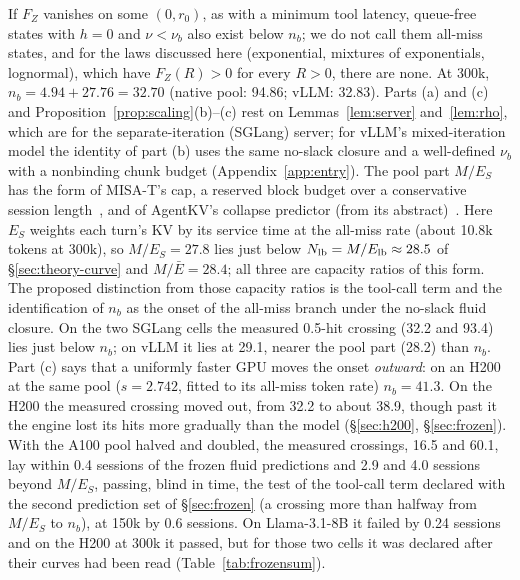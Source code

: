 \noindent If $F_Z$ vanishes on some $(0,r_0)$, as with a minimum tool latency, queue-free states with $h=0$ and $\nu<\nu_b$ also exist below $n_b$; we do not call them all-miss states, and for the laws discussed here (exponential, mixtures of exponentials, lognormal), which have $F_Z(R)>0$ for every $R>0$, there are none. At 300k, $n_b=4.94+27.76=32.70$ (native pool: 94.86; vLLM: 32.83). Parts (a) and (c) and Proposition~\ref{prop:scaling}(b)--(c) rest on Lemmas~\ref{lem:server} and~\ref{lem:rho}, which are for the separate-iteration (SGLang) server; for vLLM's mixed-iteration model the identity of part (b) uses the same no-slack closure and a well-defined $\nu_b$ with a nonbinding chunk budget (Appendix~\ref{app:entry}). The pool part $M/E_S$ has the form of MISA-T's cap, a reserved block budget over a conservative session length~\citep{hong2026misat}, and of AgentKV's collapse predictor (from its abstract)~\citep{anon2026agentkv}. Here $E_S$ weights each turn's KV by its service time at the all-miss rate (about 10.8k tokens at 300k), so $M/E_S=27.8$ lies just below $N_{\mathrm{lb}}=M/E_{\mathrm{lb}}\approx28.5$ of \S\ref{sec:theory-curve} and $M/\bar E=28.4$; all three are capacity ratios of this form. The proposed distinction from those capacity ratios is the tool-call term and the identification of $n_b$ as the onset of the all-miss branch under the no-slack fluid closure. On the two SGLang cells the measured 0.5-hit crossing (32.2 and 93.4) lies just below $n_b$; on vLLM it lies at 29.1, nearer the pool part (28.2) than $n_b$. Part (c) says that a uniformly faster GPU moves the onset \emph{outward}: on an H200 at the same pool ($s=2.742$, fitted to its all-miss token rate) $n_b=41.3$. On the H200 the measured crossing moved out, from 32.2 to about 38.9, though past it the engine lost its hits more gradually than the model (\S\ref{sec:h200}, \S\ref{sec:frozen}). With the A100 pool halved and doubled, the measured crossings, 16.5 and 60.1, lay within 0.4 sessions of the frozen fluid predictions and 2.9 and 4.0 sessions beyond $M/E_S$, passing, blind in time, the test of the tool-call term declared with the second prediction set of \S\ref{sec:frozen} (a crossing more than halfway from $M/E_S$ to $n_b$), at 150k by 0.6 sessions. On Llama-3.1-8B it failed by 0.24 sessions and on the H200 at 300k it passed, but for those two cells it was declared after their curves had been read (Table~\ref{tab:frozensum}).

